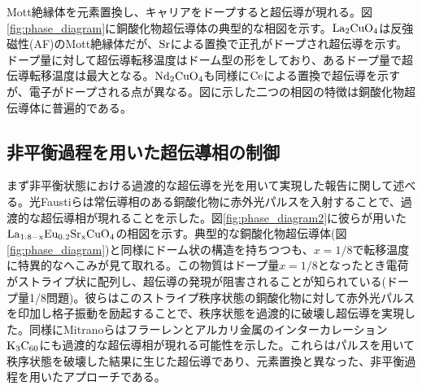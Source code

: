Mott絶縁体を元素置換し、キャリアをドープすると超伝導が現れる。図\ref{fig:phase_diagram}に銅酸化物超伝導体の典型的な相図を示す\cite{Andrea2003}。$\rm La_2CuO_4$は反強磁性(AF)のMott絶縁体だが、$\rm Sr$による置換で正孔がドープされ超伝導を示す。ドープ量に対して超伝導転移温度はドーム型の形をしており、あるドープ量で超伝導転移温度は最大となる。$\rm Nd_2CuO_4$も同様に$\rm Ce$による置換で超伝導を示すが、電子がドープされる点が異なる。図に示した二つの相図の特徴は銅酸化物超伝導体に普遍的である\cite{Lee2006}。



\subsection{非平衡過程を用いた超伝導相の制御}
まず非平衡状態における過渡的な超伝導を光を用いて実現した報告に関して述べる。光Faustiらは常伝導相のある銅酸化物に赤外光パルスを入射することで、過渡的な超伝導相が現れることを示した\cite{Fausti,Hunt2015}。図\ref{fig:phase_diagram2}に彼らが用いた$\rm La_{1.8-x}Eu_{0.2}Sr_{x}CuO_4$の相図を示す\cite{Cavalleri2018}。典型的な銅酸化物超伝導体(図\ref{fig:phase_diagram})と同様にドーム状の構造を持ちつつも、$x=1/8$で転移温度に特異的なへこみが見て取れる。この物質はドープ量$x=1/8$となったとき電荷がストライプ状に配列し、超伝導の発現が阻害されることが知られている(ドープ量1/8問題)。彼らはこのストライプ秩序状態の銅酸化物に対して赤外光パルスを印加し格子振動を励起することで、秩序状態を過渡的に破壊し超伝導を実現した。同様にMitranoらはフラーレンとアルカリ金属のインターカレーション$\rm K_3C_{60}$にも過渡的な超伝導相が現れる可能性を示した\cite{Mitrano2016}。これらはパルスを用いて秩序状態を破壊した結果に生じた超伝導であり、元素置換と異なった、非平衡過程を用いたアプローチである。
